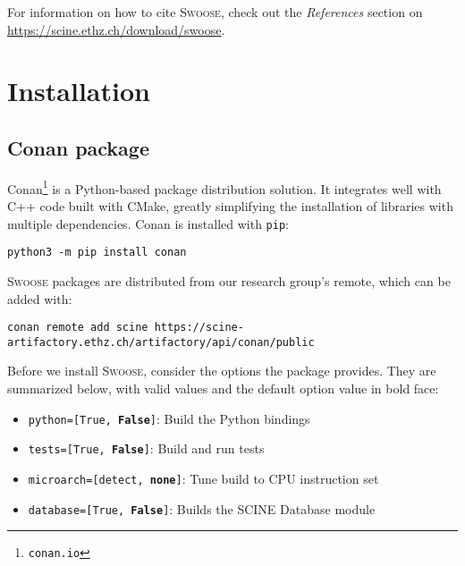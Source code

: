 \documentclass[]{tufte-book}
\begin{document}
For information on how to cite \textsc{Swoose}, check out the \textit{References} section on \href{https://scine.ethz.ch/download/swoose}{https://scine.ethz.ch/download/swoose}.

\enlargethispage{\baselineskip}

\chapter{Installation}\label{ch:installation}

\section{Conan package}
Conan\footnote{\texttt{conan.io}} is a Python-based package distribution
solution. It integrates well with C++ code built with CMake, greatly simplifying
the installation of libraries with multiple dependencies. Conan is installed
with \texttt{pip}:

\begin{mdframed}[backgroundcolor=LightSteelBlue!25, linewidth=0pt]
\begin{verbatim}
python3 -m pip install conan
\end{verbatim}
\end{mdframed}

\textsc{Swoose} packages are distributed from our research group's remote,
which can be added with:

\begin{mdframed}[backgroundcolor=LightSteelBlue!25, userdefinedwidth=16.1cm, linewidth=0pt]
\begin{verbatim}
conan remote add scine https://scine-artifactory.ethz.ch/artifactory/api/conan/public
\end{verbatim}
\end{mdframed}

Before we install \textsc{Swoose}, consider the options the package
provides. They are summarized below, with valid values and the default option
value in bold face:

\begin{itemize}
  \item \texttt{python=[True, \textbf{False}]}: Build the Python bindings
  \item \texttt{tests=[True, \textbf{False}]}: Build and run tests
  \item \texttt{microarch=[detect, \textbf{none}]}: Tune build to CPU
    instruction set
  \item \texttt{database=[True, \textbf{False}]}: Builds the SCINE Database module
\end{itemize}
\end{document}
